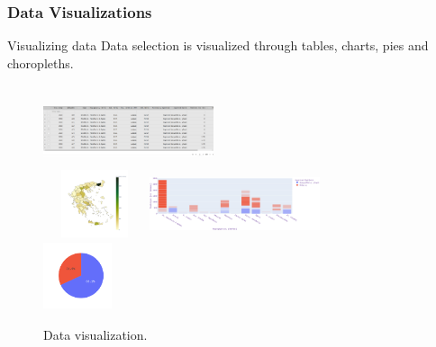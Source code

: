 \documentclass{beamer}
\begin{document}
    \begin{frame}
    \frametitle{Data Visualizations}
    
	    \begin{exampleblock}{Visualizing data}
	    Data selection is visualized through tables, charts, pies and choropleths.
		\end{exampleblock}
		
		\begin{figure}[h]
		\begin{columns}[t]
				\centering
				\includegraphics[width=5cm,height=2cm]{05_table}\\
				\includegraphics[width=3cm,height=2cm]{04_choropleth}
				\centering
				\includegraphics[width=5cm,height=2cm]{06_chart}\\
				\includegraphics[width=2cm,height=2cm]{03_pie}
			\end{columns}
			\caption{Data visualization.}
			\label{fig:visuals}
	    \end{figure} 
    \end{frame}
    
\end{document}
